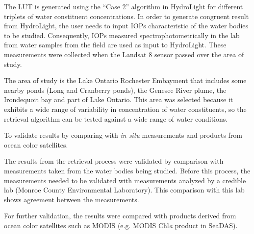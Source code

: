 \begin{enumerate}
The LUT is generated using the ``Case 2'' algorithm in HydroLight for different triplets of water constituent concentrations. In order to generate congruent result from HydroLight, the user needs to input IOPs characteristic of the water bodies to be studied. Consequently, IOPs measured spectrophotometrically in the lab from water samples from the field are used as input to HydroLight. These measurements were collected when the Landsat 8 sensor passed over the area of study.

The area of study is the Lake Ontario Rochester Embayment that includes some nearby ponds (Long and Cranberry ponds), the Genesee River plume, the Irondequoit bay and part of Lake Ontario. This area was selected because it exhibits a wide range of variability in concentration of water constituents, so the retrieval algorithm can be tested against a wide range of water conditions.
 
	{\bf \item To validate results by comparing with {\it in situ} measurements and products from ocean color satellites.}

The results from the retrieval process were validated by comparison with measurements taken from the water bodies being studied. Before this process, the measurements needed to be validated with measurements analyzed by a credible lab (Monroe County Environmental Laboratory). This comparison with this lab shows agreement between the measurements. 

For further validation, the results were compared with products derived from ocean color satellites such as MODIS (e.g. MODIS Chl{\it a} product in SeaDAS).


\end{enumerate}

